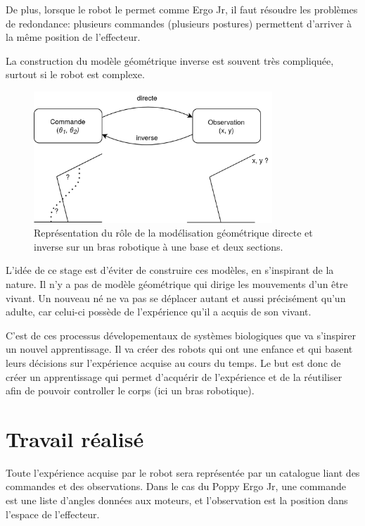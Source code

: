 \documentclass[11pt,french]{report}
\begin{document}
De plus, lorsque le robot le permet comme Ergo Jr, il faut résoudre les problèmes de redondance: plusieurs commandes (plusieurs postures) permettent d'arriver à la même position de l'effecteur.

La construction du modèle géométrique inverse est souvent très compliquée, surtout si le robot est complexe.

\begin{figure}
    \centering
    \includegraphics[height=140pt]{Modelisation_geometrique_diagram} 
    \caption{Représentation du rôle de la modélisation géométrique directe et inverse sur un bras robotique à une base et deux sections.}
    \label{fig:SchemaModelisation}
\end{figure}

\phantom{INVISIBLE LINE}

L'idée de ce stage est d'éviter de construire ces modèles, en s'inspirant de la nature.
Il n'y a pas de modèle géométrique qui dirige les mouvements d'un être vivant.
Un nouveau né ne va pas se déplacer autant et aussi précisément qu'un adulte, car celui-ci possède de l'expérience qu'il a acquis de son vivant.

C'est de ces processus dévelopementaux de systèmes biologiques que va s'inspirer un nouvel apprentissage.
Il va créer des robots qui ont une enfance et qui basent leurs décisions sur l'expérience acquise au cours du temps.
Le but est donc de créer un apprentissage qui permet d'acquérir de l'expérience et de la réutiliser afin de pouvoir controller le corps (ici un bras robotique).

\chapter{Travail réalisé}

Toute l'expérience acquise par le robot sera représentée par un catalogue liant des commandes et des observations.
Dans le cas du Poppy Ergo Jr, une commande est une liste d'angles données aux moteurs, et l'observation est la position dans l'espace de l'effecteur.
\end{document}
